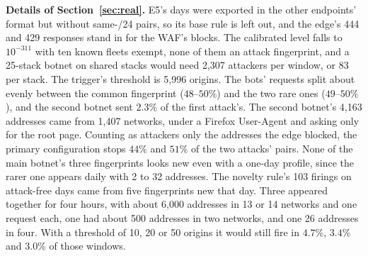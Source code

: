 \documentclass[conference,letterpaper,10pt]{IEEEtran}
\newcommand\1{\textit{(i)}}
\newcommand\2{\textit{(ii)}}
\newcommand\3{\textit{(iii)}}
\newcommand\4{\textit{(iv)}}
\newcommand\5{\textit{(v)}}
\newcommand\6{\textit{(vi)}}
\newcommand\7{\textit{(vii)}}
\newcommand\8{\textit{(viii)}}
\newcommand\9{\textit{(ix)}}
\begin{document}
\textbf{Details of Section~\ref{sec:real}.} E5's days were exported in the other endpoints' format but without same-/24 pairs, so its base rule is left out, and the edge's 444 and 429 responses stand in for the WAF's blocks. The calibrated level falls to $10^{-311}$ with ten known fleets exempt, none of them an attack fingerprint, and a 25-stack botnet on shared stacks would need 2,307 attackers per window, or 83 per stack. The trigger's threshold is 5,996 origins. The bots' requests split about evenly between the common fingerprint ($48$--$50\%$) and the two rare ones ($49$--$50\%$), and the second botnet sent $2.3\%$ of the first attack's. The second botnet's 4,163 addresses came from 1,407 networks, under a Firefox User-Agent and asking only for the root page. Counting as attackers only the addresses the edge blocked, the primary configuration stops $44\%$ and $51\%$ of the two attacks' pairs.   None of the main botnet's three fingerprints looks new even with a one-day profile, since the rarer one appears daily with 2 to 32 addresses. The novelty rule's 103 firings on attack-free days came from five fingerprints new that day. Three appeared together for four hours, with about 6,000 addresses in 13 or 14 networks and one request each, one had about 500 addresses in two networks, and one 26 addresses in four. With a threshold of 10, 20 or 50 origins it would still fire in $4.7\%$, $3.4\%$ and $3.0\%$ of those windows.


\end{document}
